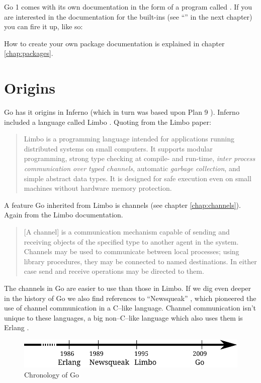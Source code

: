 Go 1 comes with its own documentation in the form of a program called 
. If you are interested in the documentation
for the built-ins (see ``'' in the next chapter) you
can fire it up, like so:
\begin{display}
\pr {}
\end{display}

How to create your own package documentation is explained in chapter \ref{chap:packages}.

\section{Origins}
Go has it origins in Inferno \cite{inferno} (which in turn was based
upon Plan 9 \cite{plan9}). Inferno included a language called Limbo
\cite{limbo}. Quoting from the Limbo paper:
\begin{quote}
Limbo is a programming language intended for applications running
distributed systems on small computers. It supports modular programming,
strong type checking at compile- and run-time, \emph{inter process
communication over typed channels}, automatic \emph{garbage collection}, and
simple abstract data types. It is designed for safe execution even on
small machines without hardware memory protection.
\end{quote}
A feature Go inherited from Limbo is channels (see chapter
\ref{chap:channels}). Again from the Limbo documentation.
\begin{quote}
[A channel] is a communication mechanism capable of sending and receiving objects of
the specified type to another agent in the system. Channels may be used
to communicate between local processes; using library procedures, they
may be connected to named destinations. In either case send and receive
operations may be directed to them.
\end{quote}
The channels in Go are easier to use than those in Limbo.
If we dig even deeper in the history of Go we also find references
to ``Newsqueak'' \cite{newsqueak}, which pioneered the use of 
channel communication in a C--like language. Channel
communication isn't unique to these languages, a big non--C--like
language which also uses them is Erlang \cite{erlang}.

\begin{figure}[H]
\caption{Chronology of Go}
\label{fig:chrono-of-go}
\begin{center}
\includegraphics[scale=0.65]{fig/go-history.pdf}
\end{center}
\end{figure}

